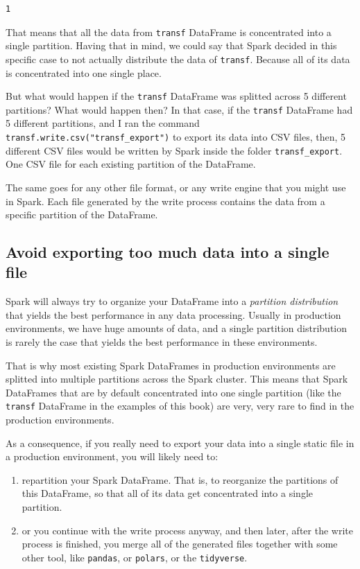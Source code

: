 \documentclass[
  11pt,
  letterpaper,
  DIV=11,
  numbers=noendperiod]{scrreprt}
\providecommand{\tightlist}{%
  \setlength{\itemsep}{0pt}\setlength{\parskip}{0pt}}\usepackage{longtable,booktabs,array}
\begin{document}
\begin{verbatim}
1
\end{verbatim}

That means that all the data from \texttt{transf} DataFrame is
concentrated into a single partition. Having that in mind, we could say
that Spark decided in this specific case to not actually distribute the
data of \texttt{transf}. Because all of its data is concentrated into
one single place.

But what would happen if the \texttt{transf} DataFrame was splitted
across 5 different partitions? What would happen then? In that case, if
the \texttt{transf} DataFrame had 5 different partitions, and I ran the
command \texttt{transf.write.csv("transf\_export")} to export its data
into CSV files, then, 5 different CSV files would be written by Spark
inside the folder \texttt{transf\_export}. One CSV file for each
existing partition of the DataFrame.

The same goes for any other file format, or any write engine that you
might use in Spark. Each file generated by the write process contains
the data from a specific partition of the DataFrame.

\subsection{Avoid exporting too much data into a single
file}\label{avoid-exporting-too-much-data-into-a-single-file}

Spark will always try to organize your DataFrame into a \emph{partition
distribution} that yields the best performance in any data processing.
Usually in production environments, we have huge amounts of data, and a
single partition distribution is rarely the case that yields the best
performance in these environments.

That is why most existing Spark DataFrames in production environments
are splitted into multiple partitions across the Spark cluster. This
means that Spark DataFrames that are by default concentrated into one
single partition (like the \texttt{transf} DataFrame in the examples of
this book) are very, very rare to find in the production environments.

As a consequence, if you really need to export your data into a single
static file in a production environment, you will likely need to:

\begin{enumerate}
\def\labelenumi{\arabic{enumi}.}
\tightlist
\item
  repartition your Spark DataFrame. That is, to reorganize the
  partitions of this DataFrame, so that all of its data get concentrated
  into a single partition.
\item
  or you continue with the write process anyway, and then later, after
  the write process is finished, you merge all of the generated files
  together with some other tool, like \texttt{pandas}, or
  \texttt{polars}, or the \texttt{tidyverse}.
\end{enumerate}
\end{document}
